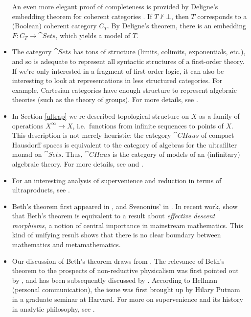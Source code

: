 \begin{itemize}
  An even more elegant proof of completeness is provided by Deligne's
  embedding theorem for coherent categories \cite[see][]{makkai}.  If
  $T\not\vdash\bot$, then $T$ corresponds to a (Boolean) coherent
  category $C_T$.  By Deligne's theorem, there is an embedding
  $F:C_T\to \cat{Sets}$, which yields a model of $T$.
\item The category $\cat{Sets}$ has tons of structure (limits,
  colimits, exponentials, etc.), and so is adequate to represent all
  syntactic structures of a first-order theory.  If we're only
  interested in a fragment of first-order logic, it can also be
  interesting to look at representations in less structured
  categories.  For example, Cartesian categories have enough structure
  to represent algebraic theories (such as the theory of groups).  For
  more details, see \cite{johnstone}.
\item In Section \ref{ultrap} we re-described topological structure on
  $X$ as a family of operations $X^{\infty}\to X$, i.e.\ functions
  from infinite sequences to points of $X$.  This description is not
  merely heuristic: the category $\cat{CHaus}$ of compact Hausdorff
  spaces is equivalent to the category of algebras for the ultrafilter
  monad on $\cat{Sets}$.  Thus, $\cat{CHaus}$ is the category of
  models of an (infinitary) algebraic theory.  For more details, see
  \cite[VI.9]{cwm} and \cite[1.5.24]{manes}.
\item For an interesting analysis of supervenience and reduction in
  terms of ultraproducts, see \cite{dewar-sup}.
\item Beth's theorem first appeared in \citeyearpar{beth}, and
  Svenonius' in \citeyearpar{svenonius}.  In recent work,
  \cite{makkai-duality,zawadowski,moerdijk1999} show that Beth's
  theorem is equivalent to a result about {\it effective descent
    morphisms}, a notion of central importance in mainstream
  mathematics.  This kind of unifying result shows that there is no
  clear boundary between mathematics and metamathematics.
\item Our discussion of Beth's theorem draws from \cite{barrett-beth}.
  The relevance of Beth's theorem to the prospects of non-reductive
  physicalism was first pointed out by \cite{hellman}, and has been
  subsequently discussed by
  \cite{bealer,hellman1985,tennant,tennant-book}.  According to
  Hellman (personal communication), the issue was first brought up by
  Hilary Putnam in a graduate seminar at Harvard.  For more on
  supervenience and its history in analytic philosophy, see
  \cite{superv}.
\end{itemize}



